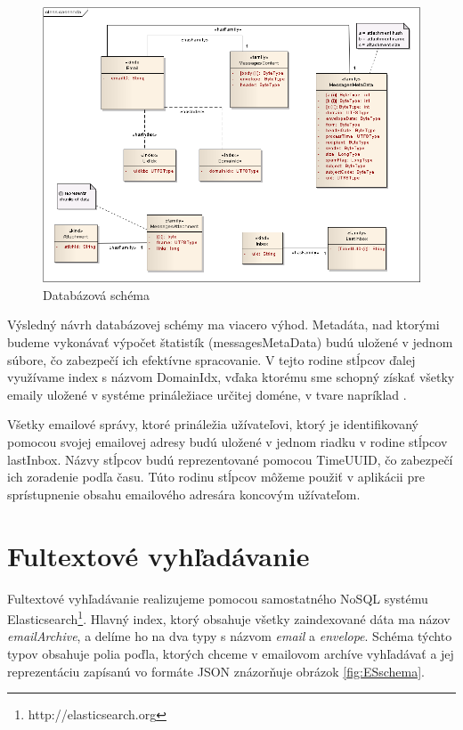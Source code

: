 \documentclass[11pt,twoside,a4paper]{book}
\begin{document}
\begin{figure}[h]
 \centering
 \includegraphics[width=17cm]{./figures/cassandra.png}
 \caption{Databázová schéma}
 \label{fig:Cschema}
\end{figure}

Výsledný návrh databázovej schémy ma viacero výhod. Metadáta, nad ktorými budeme vykonávať výpočet štatistík (messagesMetaData) budú uložené v jednom súbore, čo zabezpečí ich efektívne spracovanie. V tejto rodine stĺpcov ďalej využívame index s názvom DomainIdx, vďaka ktorému sme schopný získať všetky emaily uložené v systéme prináležiace určitej doméne, v tvare napríklad . 

Všetky emailové správy, ktoré prináležia užívateľovi, ktorý je identifikovaný pomocou svojej emailovej adresy budú uložené v jednom riadku v rodine stĺpcov lastInbox. Názvy stĺpcov budú reprezentované pomocou TimeUUID, čo zabezpečí ich zoradenie podľa času. Túto rodinu stĺpcov môžeme použiť v aplikácii pre sprístupnenie obsahu emailového adresára koncovým užívateľom.





\section{Fultextové vyhľadávanie}

Fultextové vyhľadávanie realizujeme pomocou samostatného NoSQL systému Elasticsearch\footnote{http://elasticsearch.org}. Hlavný index, ktorý obsahuje všetky zaindexované dáta ma názov \emph{emailArchive}, a delíme ho na dva typy s názvom \emph{email} a \emph{envelope}. Schéma týchto typov obsahuje polia poďla, ktorých chceme v emailovom archíve vyhľadávať a jej reprezentáciu zapísanú vo formáte JSON znázorňuje obrázok \ref{fig:ESschema}.
\end{document}
